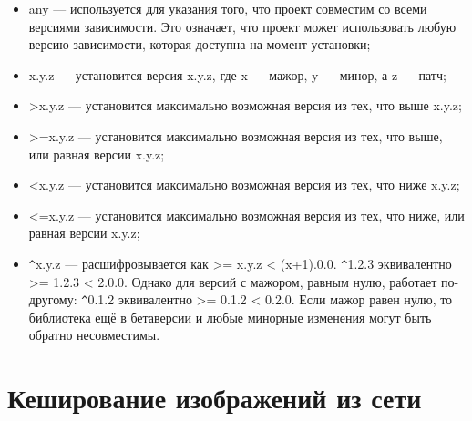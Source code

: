 \begin{itemize}
	\item any --- используется для указания того,
		что проект совместим со всеми версиями зависимости.
		Это означает, что проект может использовать любую версию зависимости,
		которая доступна на момент установки;
	\item x.y.z --- установится версия x.y.z,
		где x — мажор, y — минор, а z — патч;
	\item >x.y.z --- установится максимально возможная версия из тех,
		что выше x.y.z;
	\item >=x.y.z --- установится максимально возможная версия из тех,
		что выше, или равная версии x.y.z;
	\item <x.y.z --- установится максимально возможная версия из тех,
		что ниже x.y.z;
	\item <=x.y.z --- установится максимально возможная версия из тех,
		что ниже, или равная версии x.y.z;
	\item \verb|^|x.y.z --- расшифровывается как >= x.y.z < (x+1).0.0.
		\verb|^|1.2.3 эквивалентно >= 1.2.3 < 2.0.0.
		Однако для версий с мажором, равным нулю,
		работает по-другому: \verb|^|0.1.2 эквивалентно >= 0.1.2 < 0.2.0.
		Если мажор равен нулю, то библиотека ещё в бетаверсии
		и любые минорные изменения могут быть обратно несовместимы.
\end{itemize}

\section{Кеширование изображений из сети}

